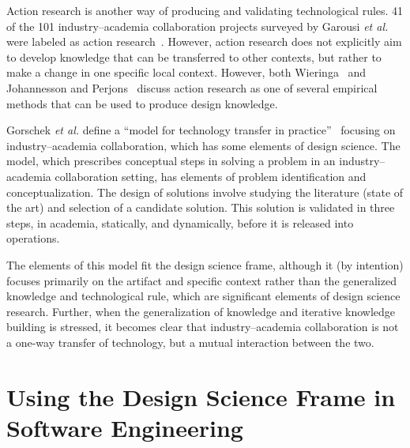\documentclass[graybox]{svmult}
\begin{document}
Action research is another way of producing and validating technological rules.  41 of the 101 industry--academia collaboration projects surveyed by Garousi \emph{et al.} were labeled as action research~\cite{Garousi2019}. However, action research does not explicitly aim to develop knowledge that can be transferred to other contexts, but rather to make a change in one specific local context. However, both Wieringa~\cite{wieringa_technical_2012} and Johannesson and Perjons~\cite{johannesson_introduction_2014} discuss action research as one of several empirical methods that can be used to produce design knowledge.


Gorschek \emph{et al.} define a ``model for technology transfer in practice''~\cite{GorschekSW2006} focusing on industry--academia collaboration, which has some elements of design science. The model, which prescribes conceptual steps in solving a problem in an industry--academia collaboration setting, has elements of problem identification and conceptualization. The design of solutions involve studying the literature (state of the art) and selection of a candidate solution. This solution is validated in three steps, in academia, statically, and dynamically, before it is released into operations. 

The elements of this model fit the design science frame, although it (by intention) focuses primarily on the artifact and specific context rather than the generalized knowledge and technological rule, which are significant elements of design science research. Further, when the generalization of knowledge and iterative knowledge building is stressed, it becomes clear that industry--academia collaboration is not a one-way transfer of technology, but a mutual interaction between the two.


\section{Using the Design Science Frame in Software Engineering}
\label{sec:UsingDSinSE}

\end{document}
